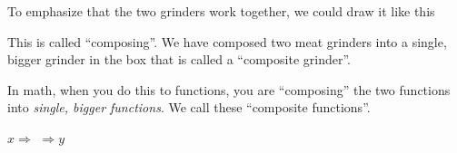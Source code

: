 \begin{center}
\end{center}
To emphasize that the two grinders work together, 
we could draw it like this 
\begin{center}
\end{center}
This is called ``composing''. 
We have composed two meat grinders
into a single, bigger grinder in the box that is called 
a ``composite grinder''.

In math, when you do this to functions,
you are ``composing'' the two functions
into \emph{single, bigger functions}.
We call these ``composite functions''.

\begin{center}
\vspace{1em}
\(
    x
    \Longrightarrow
\)
\(
    \Longrightarrow
    y
\)
\vspace{1em}
\end{center}

